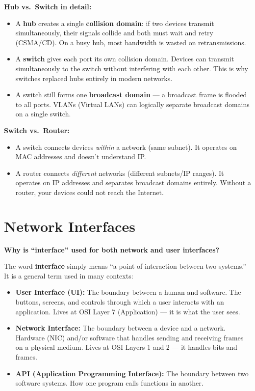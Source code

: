 \documentclass[11pt, letterpaper]{article}
\begin{document}
\textbf{Hub vs.\ Switch in detail:}
\begin{itemize}[noitemsep]
  \item A \textbf{hub} creates a single \textbf{collision domain}: if two devices transmit
        simultaneously, their signals collide and both must wait and retry (CSMA/CD). On a
        busy hub, most bandwidth is wasted on retransmissions.
  \item A \textbf{switch} gives each port its own collision domain. Devices can transmit
        simultaneously to the switch without interfering with each other. This is why switches
        replaced hubs entirely in modern networks.
  \item A switch still forms one \textbf{broadcast domain} --- a broadcast frame is flooded
        to all ports. VLANs (Virtual LANs) can logically separate broadcast domains on a
        single switch.
\end{itemize}

\textbf{Switch vs.\ Router:}
\begin{itemize}[noitemsep]
  \item A switch connects devices \emph{within} a network (same subnet). It operates on
        MAC addresses and doesn't understand IP.
  \item A router connects \emph{different} networks (different subnets/IP ranges). It
        operates on IP addresses and separates broadcast domains entirely. Without a router,
        your devices could not reach the Internet.
\end{itemize}

\section*{Network Interfaces}

\textbf{Why is ``interface'' used for both network and user interfaces?}

The word \textbf{interface} simply means ``a point of interaction between two systems.'' It
is a general term used in many contexts:
\begin{itemize}[noitemsep]
  \item \textbf{User Interface (UI):} The boundary between a human and software. The buttons,
        screens, and controls through which a user interacts with an application. Lives at
        OSI Layer 7 (Application) --- it is what the user sees.
  \item \textbf{Network Interface:} The boundary between a device and a network. Hardware
        (NIC) and/or software that handles sending and receiving frames on a physical medium.
        Lives at OSI Layers 1 and 2 --- it handles bits and frames.
  \item \textbf{API (Application Programming Interface):} The boundary between two software
        systems. How one program calls functions in another.
\end{itemize}
\end{document}
